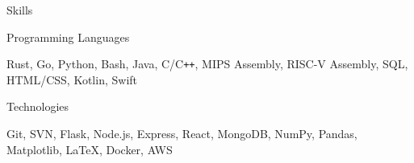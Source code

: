 \documentclass{resume}
\begin{document}
\begin{rSection}{\large Skills}
\begin{rSubsection}{Programming Languages}{}{}{}
\item Rust, Go, Python, Bash, Java, C/C{}\verb!++!, MIPS Assembly, RISC-V Assembly, SQL, HTML/CSS, Kotlin, Swift 
\end{rSubsection}

\begin{rSubsection}{Technologies}{}{}{}
\item Git, SVN, Flask, Node.js, Express, React, MongoDB, NumPy, Pandas, Matplotlib, LaTeX, Docker, AWS
\end{rSubsection}

\end{rSection}
\end{document}

